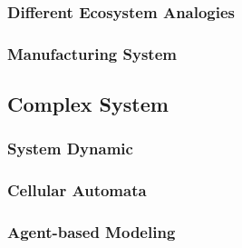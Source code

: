 \subsubsection{Different Ecosystem Analogies}

\subsubsection{Manufacturing System}








\subsection{Complex System} %
\label{sub:complex_system}
\subsubsection{System Dynamic}

\subsubsection{Cellular Automata}

\subsubsection{Agent-based Modeling}
